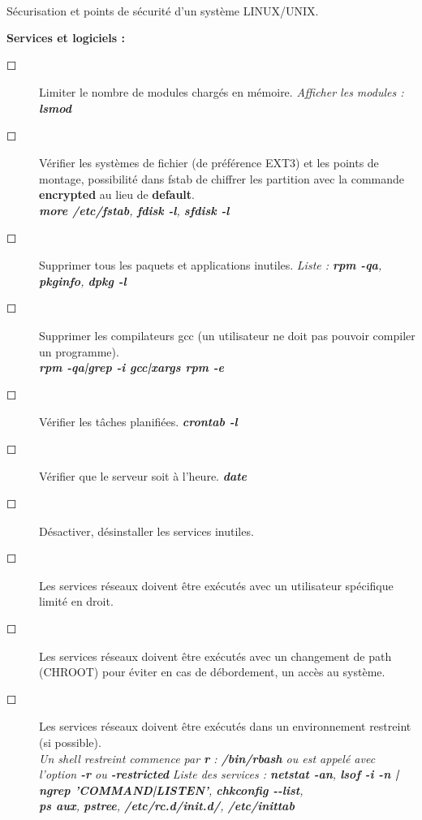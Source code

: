 \documentclass[a4paper,11pt]{article}				    %
\begin{document}
{
\\S\'ecurisation et points de s\'ecurit\'e d'un syst\`eme LINUX/UNIX.
}
{
\textbf{Services et logiciels :}
\begin{description}
	\item[$\Square$] Limiter le nombre de modules charg\'es en m\'emoire. 
	{\sl \color{blue}Afficher les modules : \textbf{lsmod}}

	\item[$\Square$] V\'erifier les syst\`emes de fichier (de pr\'ef\'erence EXT3) et les points de montage, possibilit\'e dans fstab de chiffrer les partition avec la commande \textbf{encrypted} au lieu de \textbf{default}. \\
	{\sl \color{blue}\textbf{more /etc/fstab}, \textbf{fdisk -l}, \textbf{sfdisk -l}}

	\item[$\Square$] Supprimer tous les paquets et applications inutiles. 
	{\sl \color{blue}Liste : \textbf{rpm -qa}, \textbf{pkginfo}, \textbf{dpkg -l}}

	\item[$\Square$] Supprimer les compilateurs gcc (un utilisateur ne doit pas pouvoir compiler un programme).\\
	{\sl \color{blue} \textbf{rpm -qa|grep -i gcc|xargs rpm -e}}

	\item[$\Square$] V\'erifier les t\^aches planifi\'ees. 
	{\sl \color{blue} \textbf{crontab -l}}
	\item[$\Square$] V\'erifier que le serveur soit \`a l'heure. {\sl \color{blue} \textbf{date}}
	\item[$\Square$] D\'esactiver, d\'esinstaller les services inutiles.
	\item[$\Square$] Les services r\'eseaux doivent \^etre ex\'ecut\'es avec un utilisateur sp\'ecifique limit\'e en droit.
   \item[$\Square$] Les services r\'eseaux doivent \^etre ex\'ecut\'es avec un changement de path (CHROOT) pour \'eviter en cas de d\'ebordement, un acc\`es au syst\`eme.
   \item[$\Square$] Les services r\'eseaux doivent \^etre ex\'ecut\'es dans un environnement restreint (si possible).\\
{\sl \color{blue}Un shell restreint commence par \textbf{r} : \textbf{/bin/rbash} ou est appel\'e avec l'option \textbf{-r} ou \textbf{-restricted}}
	{\sl \color{blue}Liste des services : \textbf{netstat -an}, \textbf{lsof -i -n | ngrep 'COMMAND|LISTEN'}, \textbf{chkconfig {-}{-}list},\\ \textbf{ps aux}, \textbf{pstree}, \textbf{/etc/rc.d/init.d/}, \textbf{/etc/inittab}}


\end{description}}
\end{document}
